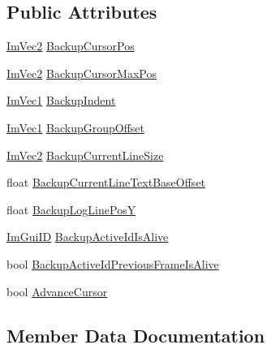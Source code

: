 \subsection*{Public Attributes}
\begin{DoxyCompactItemize}
\item 
\mbox{\hyperlink{struct_im_vec2}{Im\+Vec2}} \mbox{\hyperlink{struct_im_gui_group_data_a8b29e2d9081876fd4847b1cd86c60500}{Backup\+Cursor\+Pos}}
\item 
\mbox{\hyperlink{struct_im_vec2}{Im\+Vec2}} \mbox{\hyperlink{struct_im_gui_group_data_abb83c4db050ef7d20485902cc14c4a0d}{Backup\+Cursor\+Max\+Pos}}
\item 
\mbox{\hyperlink{struct_im_vec1}{Im\+Vec1}} \mbox{\hyperlink{struct_im_gui_group_data_a0eea82f9d3952d538431a23295e1beaa}{Backup\+Indent}}
\item 
\mbox{\hyperlink{struct_im_vec1}{Im\+Vec1}} \mbox{\hyperlink{struct_im_gui_group_data_aebda25ad372538e8209c8fc3df9d64aa}{Backup\+Group\+Offset}}
\item 
\mbox{\hyperlink{struct_im_vec2}{Im\+Vec2}} \mbox{\hyperlink{struct_im_gui_group_data_aff11cf7d8aac55c6028e21df815a0b71}{Backup\+Current\+Line\+Size}}
\item 
float \mbox{\hyperlink{struct_im_gui_group_data_a3745219bd1f4c6ee5080d8d0aaa8a712}{Backup\+Current\+Line\+Text\+Base\+Offset}}
\item 
float \mbox{\hyperlink{struct_im_gui_group_data_af67f52c70f74a3b7bce8ce46affc856b}{Backup\+Log\+Line\+PosY}}
\item 
\mbox{\hyperlink{imgui_8h_a1785c9b6f4e16406764a85f32582236f}{Im\+Gui\+ID}} \mbox{\hyperlink{struct_im_gui_group_data_aacd18774380f912245f8be65f36889cc}{Backup\+Active\+Id\+Is\+Alive}}
\item 
bool \mbox{\hyperlink{struct_im_gui_group_data_afbb6878b27a6183b10af7b07fa16daa4}{Backup\+Active\+Id\+Previous\+Frame\+Is\+Alive}}
\item 
bool \mbox{\hyperlink{struct_im_gui_group_data_a2bfc0ee6236ec2ace16634a34eda72d7}{Advance\+Cursor}}
\end{DoxyCompactItemize}


\subsection{Member Data Documentation}
\mbox{\label{struct_im_gui_group_data_a2bfc0ee6236ec2ace16634a34eda72d7}} 
